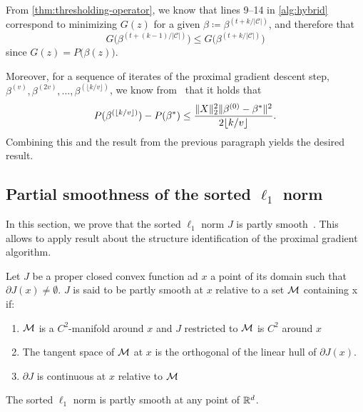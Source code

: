 From \cref{thm:thresholding-operator}, we know that lines 9--14 in \cref{alg:hybrid} correspond to minimizing \(G(z)\) for a given \(\beta \coloneqq \beta^{(t + k / |\mathcal{C}|)}\), and therefore that
\[
  G\big(\beta^{(t + (k - 1) / |\mathcal{C}|)}\big) \leq G\big(\beta^{(t + k / |\mathcal{C}|)}\big)
\]
since \(G(z) = P\big(\beta(z)\big)\).

Moreover, for a sequence of iterates of the proximal gradient descent step,
\(\beta^{(v)}, \beta^{(2v)}, \dots, \beta^{(\lfloor k / v \rfloor)}\),
we know from~\textcite[Theorem 3.1]{beck2009} that it holds that
\[
  P(\beta^{(\lfloor k / v \rfloor)}) - P(\beta^*)
  \leq \frac{\lVert {X} \rVert_2^2 \lVert {\beta^{(0)} - \beta^*} \rVert^2}{2\lfloor k / v \rfloor}.
\]
Combining this and the result from the previous paragraph yields the desired
result.



\subsection{Partial smoothness of the sorted $\ell_1$ norm}
\label{app:sec:partly_smooth}
In this section, we prove that the sorted $\ell_1$ norm $J$ is partly smooth~\parencite{lewis2003active}.
This allows to apply result about the structure identification of the proximal gradient algorithm.

\begin{definition}
  Let $J$ be a proper closed convex function ad $x$ a point of its domain such that $\partial J(x) \neq \emptyset$.
  $J$ is said to be partly smooth at $x$ relative to a set $\mathcal{M}$ containing x if:
  \begin{enumerate}
    \item $\mathcal{M}$ is a $C^2$-manifold around $x$ and $J$ restricted to $\mathcal{M}$ is $C^2$ around $x$
    \item The tangent space of $\mathcal{M}$ at $x$ is the orthogonal of the linear hull of $\partial J(x)$.
    \item $\partial J$ is continuous at $x$ relative to $\mathcal{M}$
  \end{enumerate}
\end{definition}

\begin{proposition}
  The sorted $\ell_1$ norm is partly smooth at any point of $\mathbb{R}^d$.
\end{proposition}

